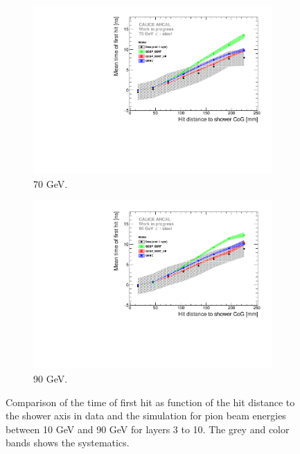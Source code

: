 \begin{figure}[htbp!]
\begin{subfigure}[t]{0.5\textwidth}
    \includegraphics[width=1\textwidth]{../Thesis_Plots/Timing/Pions/Plots/ComparisonToSim/Time_Radius_70GeV_SSF_Mokka.pdf}
    \caption{70 GeV.} \label{fig:Radius_SSF_SimData_70GeV}
  \end{subfigure}
  \hfill
  \begin{subfigure}[t]{0.5\textwidth}
    \centering
    \includegraphics[width=1\textwidth]{../Thesis_Plots/Timing/Pions/Plots/ComparisonToSim/Time_Radius_90GeV_SSF_Mokka.pdf}
    \caption{90 GeV.} \label{fig:Radius_SSF_SimData_90GeV}
  \end{subfigure}
  \caption{Comparison of the time of first hit as function of the hit distance to the shower axis in data and the \mokka simulation for pion beam energies between 10 GeV and 90 GeV for layers 3 to 10. The grey and color bands shows the systematics.}
\end{figure}


